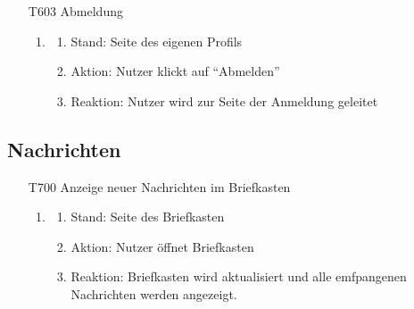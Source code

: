 \documentclass[parskip=full]{scrartcl}
\begin{document}
\begin{itemize}
		
		\newpage
		\item[T603] Abmeldung
		\begin{enumerate}
			\item
			\begin{enumerate}[nosep]	
				\item Stand: Seite des eigenen Profils
				\item Aktion: Nutzer klickt auf “Abmelden”
				\item Reaktion:  Nutzer wird zur Seite der Anmeldung geleitet
			\end{enumerate} 
		\end{enumerate}
		
		
	\end{itemize}
	
	
	\subsection{Nachrichten}
	
	\begin{itemize}
		\item[T700] Anzeige neuer Nachrichten im Briefkasten
		\begin{enumerate}
			\item
			\begin{enumerate}[nosep]	
				\item Stand:  Seite des Briefkasten
				\item Aktion: Nutzer öffnet Briefkasten
				\item Reaktion: Briefkasten wird aktualisiert und alle emfpangenen Nachrichten werden angezeigt.
			\end{enumerate} 
		\end{enumerate}
		
	\end{itemize}
\end{document}
